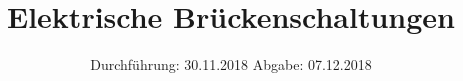 

\subject{V302}
\title{Elektrische Brückenschaltungen}
\date{
  Durchführung: 30.11.2018
  \hspace{3em}
  Abgabe: 07.12.2018
}



\maketitle
\thispagestyle{empty}
\tableofcontents
\newpage








\printbibliography


